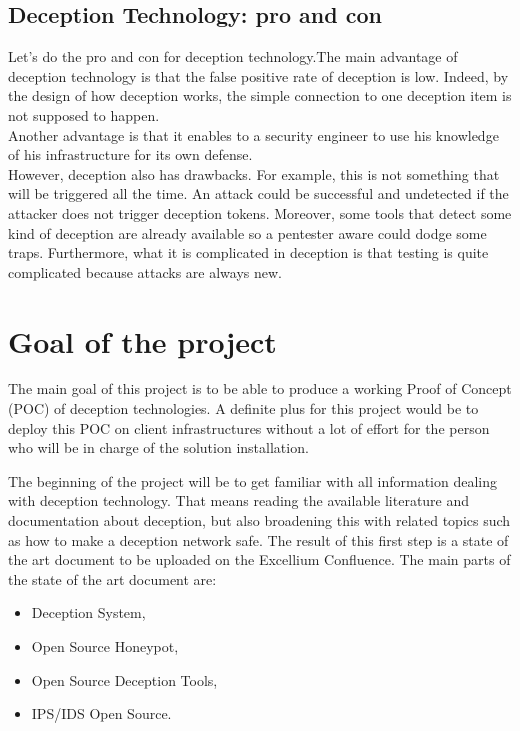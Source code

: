 \documentclass{tnreport}
\begin{document}
\subsection{Deception Technology: pro and con}


Let's do the pro and con for deception technology.The main advantage of deception technology is that the false positive rate of deception is low. Indeed, by the design of how deception works, the simple connection to one deception item is not supposed to happen.\\
Another advantage is that it enables to a security engineer to use his knowledge of his infrastructure for its own defense.\\
However, deception also has drawbacks. For example, this is not something that will be triggered all the time. An attack could be successful and undetected if the attacker does not trigger deception tokens. Moreover, some tools that detect some kind of deception are already available  so a pentester aware could dodge some traps. Furthermore, what it is complicated in deception is that testing is quite complicated because attacks are always new.

\section{Goal of the project}
The main goal of this project is to be able to produce a working Proof of Concept (\gls{POC}) of deception technologies. A definite plus for this project would be to deploy this \gls{POC} on client infrastructures without a lot of effort for the person who will be in charge of the solution installation.

The beginning of the project will be to get familiar with all information dealing with deception technology. That means reading the available literature and documentation about deception, but also broadening this with related topics such as how to make a deception network safe. The result of this first step is a state of the art document to be uploaded on the \gls{Excellium} Confluence. The main parts of the state of the art document are:

\begin{itemize}
    \item Deception System,
    \item Open Source Honeypot,
    \item Open Source Deception Tools,
    \item \gls{IPS}/\gls{IDS} Open Source.
\end{itemize}
\end{document}
